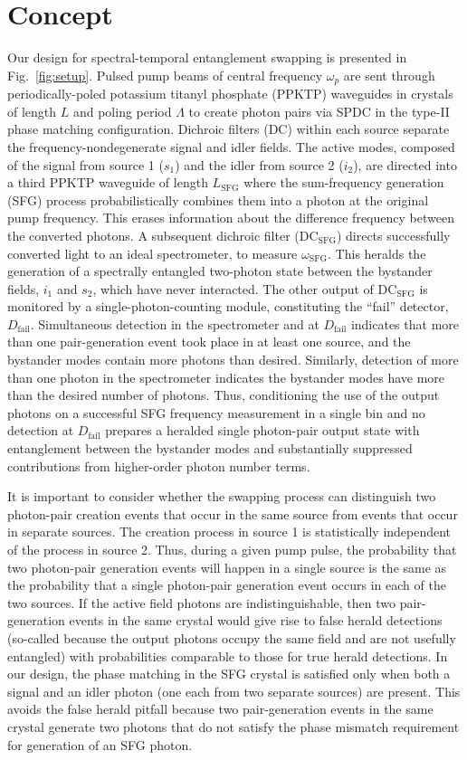 \documentclass[twocolumn,amssymb, nobibnotes, showpacs, aps, pra,10pt]{revtex4-1}
\newcommand*{\wsfg}{\omega_\textrm{SFG}}
\begin{document}
\section{Concept}
Our design for spectral-temporal entanglement swapping is presented in Fig.\ \ref{fig:setup}. Pulsed pump beams of central frequency $\omega_p$ are sent through periodically-poled potassium titanyl phosphate (PPKTP)  waveguides in crystals of length $L$ and poling period $\Lambda$ to create photon pairs via SPDC in the type-II phase matching configuration. Dichroic filters (DC) within each source separate the frequency-nondegenerate signal and idler fields. The active modes, composed of the signal from source 1 ($s_1$) and the idler from source 2 ($i_2$), are directed into a third PPKTP waveguide of length $L_{\text{SFG}}$ where the sum-frequency generation (SFG) process probabilistically combines them into a photon at the original pump frequency. This erases information about the difference frequency between the converted photons. A subsequent dichroic filter ($\text{DC}_\text{SFG}$) directs successfully converted light to an ideal spectrometer, to measure $\wsfg$. This heralds the generation of a spectrally entangled two-photon state between the bystander fields, $i_1$ and $s_2$, which have never interacted. The other output of $\text{DC}_\text{SFG}$ is monitored by a single-photon-counting module, constituting the ``fail'' detector, $D_{\text{fail}}$.   Simultaneous detection in the spectrometer and at $D_{\text{fail}}$ indicates that more than one pair-generation event took place in at least one source, and the bystander modes contain more photons than desired. Similarly, detection of more than one photon in the  spectrometer indicates the bystander modes have more than the desired number of photons. Thus, conditioning the use of the output photons on a successful SFG frequency measurement in a single bin and no detection at $D_{\text{fail}}$ prepares a heralded single photon-pair output state with entanglement between the bystander modes and substantially suppressed contributions from higher-order photon number terms.

It is important to consider whether the swapping process can distinguish two photon-pair creation events that occur in the same source from events that occur in separate sources. The creation process in source 1 is statistically independent of the process in source 2. Thus, during a given pump pulse, the probability that two photon-pair generation events will happen in a single source is the same as the probability that a single photon-pair generation event occurs in each of the two sources. If the active field photons are indistinguishable, then two pair-generation events in the same crystal would give rise to false herald detections (so-called because the output photons occupy the same field and are not usefully entangled) with probabilities comparable to those for true herald detections. In our design, the phase matching in the SFG crystal is satisfied only when both a signal and an idler photon (one each from two separate sources) are present. This avoids the false herald pitfall because two pair-generation events in the same crystal generate two photons that do not satisfy the phase mismatch requirement for generation of an SFG photon.
 
\end{document}
